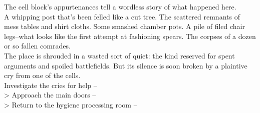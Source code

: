The cell block’s appurtenances tell a wordless story of what happened here.\\

A whipping post that’s been felled like a cut tree. The scattered remnants of mess tables and shirt cloths. Some smashed chamber pots. A pile of filed chair legs--what looks like the first attempt at fashioning spears. The corpses of a dozen or so fallen comrades.\\

The place is shrouded in a wasted sort of quiet: the kind reserved for spent arguments and spoiled battlefields. But its silence is soon broken by a plaintive cry from one of the cells.\\

 Investigate the cries for help -- \\
> Approach the main doors -- \\
> Return to the hygiene processing room -- 